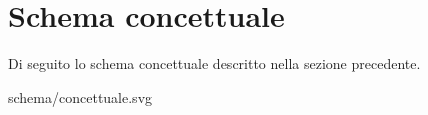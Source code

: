 \section{Schema concettuale}
Di seguito lo schema concettuale descritto nella sezione precedente.

\begin{center}
	 {schema/concettuale.svg}
\end{center}
\newpage

